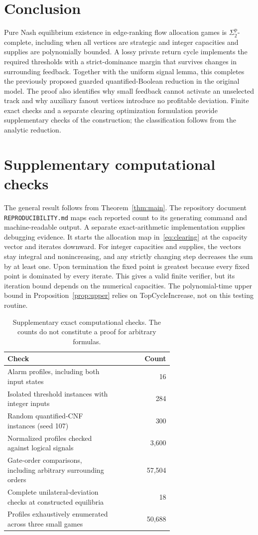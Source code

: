 \documentclass[11pt]{article}
\newcommand{\sig}{\Sigma^{\mathrm p}_2}
\begin{document}
\section{Conclusion}
Pure Nash equilibrium existence in edge-ranking flow allocation games is $\sig$-complete, including when all vertices are strategic and integer capacities and supplies are polynomially bounded. A lossy private return cycle implements the required thresholds with a strict-dominance margin that survives changes in surrounding feedback. Together with the uniform signal lemma, this completes the previously proposed guarded quantified-Boolean reduction in the original model. The proof also identifies why small feedback cannot activate an unselected track and why auxiliary fanout vertices introduce no profitable deviation. Finite exact checks and a separate clearing optimization formulation provide supplementary checks of the construction; the classification follows from the analytic reduction.

\appendix
\section{Supplementary computational checks}\label{app:checks}
The general result follows from Theorem~\ref{thm:main}. The repository document \texttt{REPRODUCIBILITY.md} maps each reported count to its generating command and machine-readable output. A separate exact-arithmetic implementation supplies debugging evidence. It starts the allocation map in~\eqref{eq:clearing} at the capacity vector and iterates downward. For integer capacities and supplies, the vectors stay integral and nonincreasing, and any strictly changing step decreases the sum by at least one. Upon termination the fixed point is greatest because every fixed point is dominated by every iterate. This gives a valid finite verifier, but its iteration bound depends on the numerical capacities. The polynomial-time upper bound in Proposition~\ref{prop:upper} relies on TopCycleIncrease, not on this testing routine.

\begin{table}[ht]
\centering
\begin{tabular}{p{0.66\linewidth}r}
\toprule Check & Count\\\midrule
Alarm profiles, including both input states & 16\\
Isolated threshold instances with integer inputs & 284\\
Random quantified-CNF instances (seed 107) & 300\\
Normalized profiles checked against logical signals & 3,600\\
Gate-order comparisons, including arbitrary surrounding orders & 57,504\\
Complete unilateral-deviation checks at constructed equilibria & 18\\
Profiles exhaustively enumerated across three small games & 50,688\\\bottomrule
\end{tabular}
\caption{Supplementary exact computational checks. The counts do not constitute a proof for arbitrary formulas.}\label{tab:checks}
\end{table}
\end{document}
